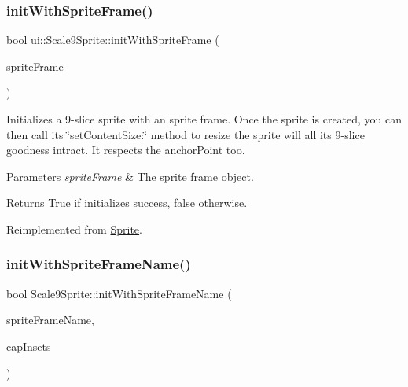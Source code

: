 \subsubsection{\texorpdfstring{init\+With\+Sprite\+Frame()}{initWithSpriteFrame()}\hspace{0.1cm}{\footnotesize\ttfamily [3/3]}}
{\footnotesize\ttfamily bool ui\+::\+Scale9\+Sprite\+::init\+With\+Sprite\+Frame (\begin{DoxyParamCaption}\item[{\hyperlink{classSpriteFrame}{Sprite\+Frame} $\ast$}]{sprite\+Frame }\end{DoxyParamCaption})\hspace{0.3cm}{\ttfamily [virtual]}}

Initializes a 9-\/slice sprite with an sprite frame. Once the sprite is created, you can then call its \char`\"{}set\+Content\+Size\+:\char`\"{} method to resize the sprite will all it\textquotesingle{}s 9-\/slice goodness intract. It respects the anchor\+Point too.


\begin{DoxyParams}{Parameters}
{\em sprite\+Frame} & The sprite frame object. \\
\hline
\end{DoxyParams}
\begin{DoxyReturn}{Returns}
True if initializes success, false otherwise. 
\end{DoxyReturn}


Reimplemented from \hyperlink{classSprite_a18c315cb483cfec2ed836c02c958810b}{Sprite}.

\mbox{\label{classui_1_1Scale9Sprite_a1d4ad0d1b13fa77c9caa40c9902a3269}} 
\subsubsection{\texorpdfstring{init\+With\+Sprite\+Frame\+Name()}{initWithSpriteFrameName()}\hspace{0.1cm}{\footnotesize\ttfamily [1/4]}}
{\footnotesize\ttfamily bool Scale9\+Sprite\+::init\+With\+Sprite\+Frame\+Name (\begin{DoxyParamCaption}\item[{const std\+::string \&}]{sprite\+Frame\+Name,  }\item[{const \hyperlink{classRect}{Rect} \&}]{cap\+Insets }\end{DoxyParamCaption})\hspace{0.3cm}{\ttfamily [virtual]}}

